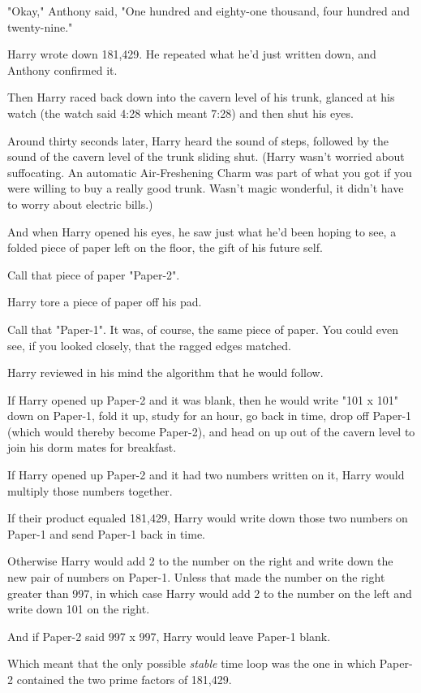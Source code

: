 "Okay," Anthony said, "One hundred and eighty-one thousand, four hundred and 
twenty-nine."

Harry wrote down 181,429. He repeated what he'd just written down, and Anthony 
confirmed it.

Then Harry raced back down into the cavern level of his trunk, glanced at his 
watch (the watch said 4:28 which meant 7:28) and then shut his eyes.

Around thirty seconds later, Harry heard the sound of steps, followed by the 
sound of the cavern level of the trunk sliding shut. (Harry wasn't worried 
about suffocating. An automatic Air-Freshening Charm was part of what you got 
if you were willing to buy a really good trunk. Wasn't magic wonderful, it 
didn't have to worry about electric bills.)

And when Harry opened his eyes, he saw just what he'd been hoping to see, a 
folded piece of paper left on the floor, the gift of his future self.

Call that piece of paper "Paper-2".

Harry tore a piece of paper off his pad.

Call that "Paper-1". It was, of course, the same piece of paper. You could even 
see, if you looked closely, that the ragged edges matched.

Harry reviewed in his mind the algorithm that he would follow.

If Harry opened up Paper-2 and it was blank, then he would write "101 x 101" 
down on Paper-1, fold it up, study for an hour, go back in time, drop off 
Paper-1 (which would thereby become Paper-2), and head on up out of the cavern 
level to join his dorm mates for breakfast.

If Harry opened up Paper-2 and it had two numbers written on it, Harry would 
multiply those numbers together.

If their product equaled 181,429, Harry would write down those two numbers on 
Paper-1 and send Paper-1 back in time.

Otherwise Harry would add 2 to the number on the right and write down the new 
pair of numbers on Paper-1. Unless that made the number on the right greater 
than 997, in which case Harry would add 2 to the number on the left and write 
down 101 on the right.

And if Paper-2 said 997 x 997, Harry would leave Paper-1 blank.

Which meant that the only possible \emph{stable} time loop was the one in which 
Paper-2 contained the two prime factors of 181,429.

